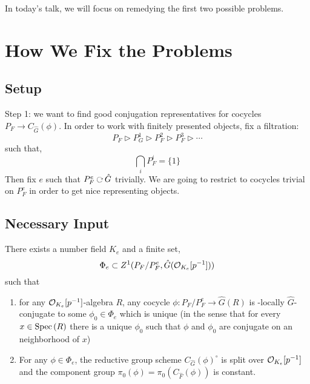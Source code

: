 \documentclass[12pt]{article}
\begin{document}
In today's talk, we will focus on remedying the first two possible problems. 

\section{How We Fix the Problems}

\subsection{Setup}

Step 1: we want to find good conjugation representatives for cocycles $P_F \to C_{\hat{G}}(\phi)$. In order to work with finitely presented objects, fix a filtration:
\[ P_F \triangleright P_G^1 \triangleright P_F^2 \triangleright P_F^3 \triangleright \cdots \]
such that,
\[ \bigcap_i P_F^i = \{ 1 \} \]
Then fix $e$ such that $P^e_F \acts \hat{G}$ trivially. We are going to restrict to cocycles trivial on $P^e_F$ in order to get nice representing objects.

\subsection{Necessary Input}

\begin{thm}
There exists a number field $K_e$ and a finite set,
\[ \Phi_e \subset Z^1(P_F / P_F^e, \hat{G}(\mathcal{O}_{K_e}[p^{-1}])) \]
such that
\begin{enumerate}
\item for any $\mathcal{O}_{K_e}[p^{-1}]$-algebra $R$, any cocycle $\phi : P_F / P_F^e \to \hat{G}(R)$ is \etale-locally $\hat{G}$-conjugate to some $\phi_0 \in \Phi_e$ which is unique (in the sense that for every $x \in \mathrm{Spec}\left( R \right)$ there is a unique $\phi_0$ such that $\phi$ and $\phi_0$ are conjugate on an \etale neighborhood of $x$)

\item For any $\phi \in \Phi_e$, the reductive group scheme $C_{\hat{G}}(\phi)^\circ$ is split over $\mathcal{O}_{K_e}[p^{-1}]$ and the component group $\pi_0(\phi) = \pi_0(C_{\hat{F}}(\phi))$ is constant.
\end{enumerate}
\end{thm}
\end{document}
